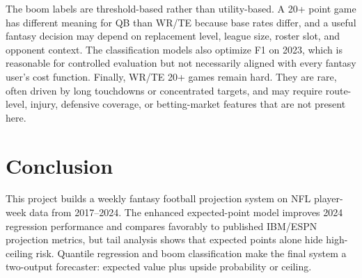 \documentclass{article}
\begin{document}
The boom labels are threshold-based rather than utility-based. A 20+ point game has different meaning for QB than WR/TE because base rates differ, and a useful fantasy decision may depend on replacement level, league size, roster slot, and opponent context. The classification models also optimize F1 on 2023, which is reasonable for controlled evaluation but not necessarily aligned with every fantasy user's cost function. Finally, WR/TE 20+ games remain hard. They are rare, often driven by long touchdowns or concentrated targets, and may require route-level, injury, defensive coverage, or betting-market features that are not present here.

\section{Conclusion}
This project builds a weekly fantasy football projection system on NFL player-week data from 2017--2024. The enhanced expected-point model improves 2024 regression performance and compares favorably to published IBM/ESPN projection metrics, but tail analysis shows that expected points alone hide high-ceiling risk. Quantile regression and boom classification make the final system a two-output forecaster: expected value plus upside probability or ceiling.

\clearpage


\end{document}
